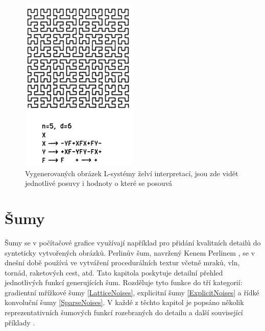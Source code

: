 \begin{figure}[H]
	\centering
	\includegraphics[scale=1]{obrazky-figures/L-system.png}
	\caption[L-system]{Vygenerovaných obrázek L-systémy želví interpretací, jsou zde vidět jednotlivé posuvy i hodnoty o které se posouvá}
\end{figure}
\newpage

\section{Šumy}
\label{noise}
Šumy se v počítačové grafice využívají například pro přidání kvalitních detailů do synteticky vytvořených obrázků. Perlinův šum, navržený Kenem Perlinem \cite{PerlinKen}, se v dnešní době používá ve vytváření procedurálních textur včetně mraků, vln, tornád, raketových cest, atd. Tato kapitola poskytuje detailní přehled jednotlivých funkcí generujících šum. Rozděluje tyto funkce do tří kategorií: gradientní mřížkové šumy \ref{LatticeNoises}, explicitní šumy \ref{ExplicitNoises} a řídké konvoluční šumy \ref{SparseNoises}. V každé z těchto kapitol je popsáno několik reprezentativních šumových funkcí rozebraných do detailu a další související příklady \cite{Lagae10}. 

